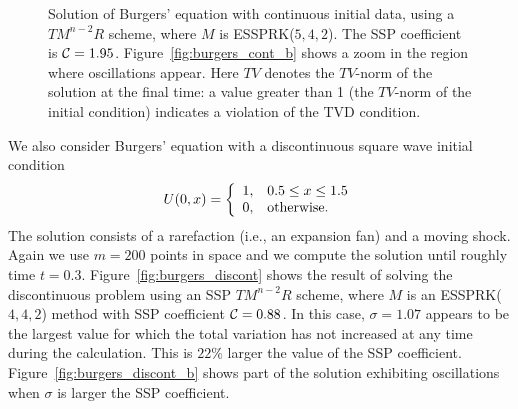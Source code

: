 \begin{figure}
    \centering
    \caption{Solution of Burgers' equation with continuous initial data, using a 
    $TM^{n-2}R$ scheme, where $ M $ is ESSPRK($5,4,2$). 
    The SSP coefficient is $\mathcal{C} = 1.95$. 
    Figure~\ref{fig:burgers_cont_b} shows a zoom in the region where 
    oscillations appear.
    Here $TV$ denotes the $TV$-norm of the solution at the final time:
    a value greater than 1 (the $TV$-norm of the initial condition)
    indicates a violation of the TVD condition.
    }
    \label{fig:burgers_cont}
\end{figure}

We also consider Burgers' equation with a discontinuous
square wave initial condition
\begin{align*}%
    U(0,x)  = \left\{
                \begin{array}{ll}
                  1, & \hbox{$0.5 \leq x \leq 1.5$} \\
                  0, & \hbox{otherwise.}
                \end{array}
              \right.
\end{align*}
The solution consists of a rarefaction (i.e., an expansion fan) and a
moving shock.
Again we use $m = 200$ points in space and we compute the solution until
roughly time $t = 0.3$.
Figure~\ref{fig:burgers_discont} shows the result of solving the
discontinuous problem using an SSP $TM^{n-2}R$ scheme, where $M$ is an
ESSPRK($4,4,2$) method with SSP coefficient $\mathcal{C} = 0.88$.
In this case, $\sigma = 1.07$ appears to be the largest value
for which the total variation has not increased at any time
during the calculation.
This is $22\%$ larger the value of the SSP coefficient.
Figure~\ref{fig:burgers_discont_b} shows part of the solution exhibiting 
oscillations when $\sigma$ is %
larger the SSP coefficient.



